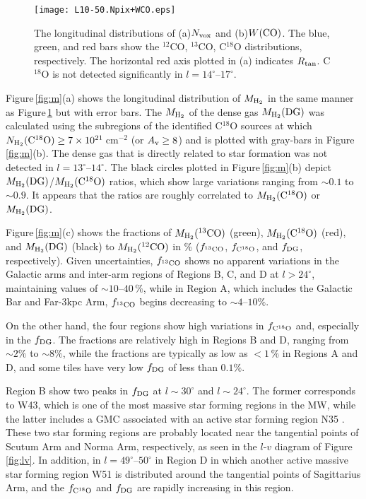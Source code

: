 \documentclass[proof]{pasj01}
\newcommand{\fDG}{f_{\rm DG}}
\newcommand{\fthree}{f_{\rm ^{13}CO}}
\newcommand{\feight}{f_{\rm C^{18}O}}
\newcommand{\mH}{M_{\rm H_2}}
\newcommand{\mDG}{M_{\rm H_2}{\rm (DG)}}
\newcommand{\mtwo}{M_{\rm H_2}{\rm (^{12}CO)}}
\newcommand{\mthree}{M_{\rm H_2}{\rm (^{13}CO)}}
\newcommand{\meight}{M_{\rm H_2}{\rm (C^{18}O)}}
\begin{document}
\begin{figure}
 \begin{center}
  \texttt{[image: L10-50.Npix+WCO.eps]}
 \end{center}
 \caption{The longitudinal distributions of (a)$N_{\rm vox}$ and (b)$W{\rm (CO)}$. The blue, green, and red bars show
the $^{12}$CO, $^{13}$CO, C$^{18}$O distributions, respectively. The horizontal red axis plotted in (a) indicates $R_{\rm tan}$. C$^{18}$O is not detected significantly in $l=14^\circ$--$17^\circ$.}\label{fig:n+w}
\end{figure}


Figure\,\ref{fig:m}(a) shows the longitudinal distribution of $M_{\rm H_2}$ in the same manner as Figure\,\ref{fig:n+w} but with error bars.
The $\mH$ of the dense gas $\mDG$ was calculated using the subregions of the identified C$^{18}$O sources at which $N_{\rm H_2}{\rm (C^{18}O)} \geq 7\times 10^{21}$\,cm$^{-2}$ (or $A_{\rm v} \geq 8$) and is plotted with gray-bars in Figure\,\ref{fig:m}(b).
The dense gas that is directly related to star formation was not detected in $l=13^\circ$--$14^\circ$.
The black circles plotted in Figure\,\ref{fig:m}(b) depict $\mDG$/$\meight$ ratios, which show large variations ranging from $\sim0.1$ to $\sim0.9$.
It appears that the ratios are roughly correlated to $\meight$ or $\mDG$.


Figure\,\ref{fig:m}(c) shows the fractions of $\mthree$ (green), $\meight$ (red), and $\mDG$ (black) to $\mtwo$ in \% ($\fthree$, $\feight$, and $\fDG$, respectively).
Given uncertainties, $\fthree$ shows no apparent variations in the Galactic arms and inter-arm regions of Regions B, C, and D at $l>24^\circ$, maintaining values of $\sim10$--$40\,\%$, while in Region A, which includes the Galactic Bar and Far-3kpc Arm, $\fthree$ begins decreasing to $\sim4$--$10\%$.

On the other hand, the four regions show high variations in $\feight$ and, especially in the $\fDG$.
The fractions are relatively high in Regions B and D, ranging from $\sim2\%$ to $\sim8\%$, while the fractions are typically as low as $<1\,\%$ in Regions A and D, and some tiles have very low $\fDG$ of less than $0.1\%$.

Region B show two peaks in $\fDG$ at $l\sim30^\circ$ and $l\sim24^\circ$. The former corresponds to W43, which is one of the most massive star forming regions in the MW, while the latter includes a GMC associated with an active star forming region N35 \citep{tor2018a}.
These two star forming regions are probably located near the tangential points of Scutum Arm and Norma Arm, respectively, as seen in the $l$-$v$ diagram of Figure\,\ref{fig:lv}.
In addition, in $l=49^\circ$--$50^\circ$ in Region D in which another active massive star forming region W51 is distributed around the tangential points of Sagittarius Arm, and the $\feight$ and $\fDG$ are rapidly increasing in this region.
\end{document}
